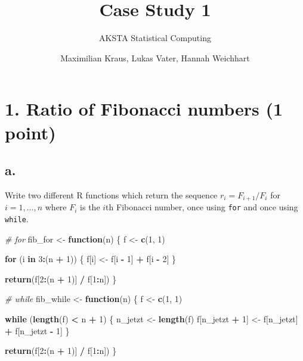 \documentclass[
]{article}
\title{Case Study 1}
\subtitle{AKSTA Statistical Computing}
\author{Maximilian Kraus, Lukas Vater, Hannah Weichhart}
\date{}
\newenvironment{Shaded}{\begin{snugshade}}{\end{snugshade}}
\newcommand{\CommentTok}[1]{\textcolor[rgb]{0.56,0.35,0.01}{\textit{#1}}}
\newcommand{\ControlFlowTok}[1]{\textcolor[rgb]{0.13,0.29,0.53}{\textbf{#1}}}
\newcommand{\DecValTok}[1]{\textcolor[rgb]{0.00,0.00,0.81}{#1}}
\newcommand{\FunctionTok}[1]{\textcolor[rgb]{0.13,0.29,0.53}{\textbf{#1}}}
\newcommand{\NormalTok}[1]{#1}
\newcommand{\OtherTok}[1]{\textcolor[rgb]{0.56,0.35,0.01}{#1}}
\newcommand{\SpecialCharTok}[1]{\textcolor[rgb]{0.81,0.36,0.00}{\textbf{#1}}}
\begin{document}
\maketitle

\section{1. Ratio of Fibonacci numbers (1
point)}\label{ratio-of-fibonacci-numbers-1-point}

\subsection{a.}\label{a.}

Write two different R functions which return the sequence
\(r_{i}=F_{i+1}/F_i\) for \(i=1,\ldots,n\) where \(F_i\) is the \(i\)th
Fibonacci number, once using \texttt{for} and once using \texttt{while}.

\begin{Shaded}
\begin{Highlighting}[]
\CommentTok{\# for }
\NormalTok{fib\_for }\OtherTok{\textless{}{-}} \ControlFlowTok{function}\NormalTok{(n) \{}
\NormalTok{  f }\OtherTok{\textless{}{-}} \FunctionTok{c}\NormalTok{(}\DecValTok{1}\NormalTok{, }\DecValTok{1}\NormalTok{)}
  
  \ControlFlowTok{for}\NormalTok{ (i }\ControlFlowTok{in} \DecValTok{3}\SpecialCharTok{:}\NormalTok{(n }\SpecialCharTok{+} \DecValTok{1}\NormalTok{)) \{}
\NormalTok{    f[i] }\OtherTok{\textless{}{-}}\NormalTok{ f[i }\SpecialCharTok{{-}} \DecValTok{1}\NormalTok{] }\SpecialCharTok{+}\NormalTok{ f[i }\SpecialCharTok{{-}} \DecValTok{2}\NormalTok{]}
\NormalTok{  \}}
  
  \FunctionTok{return}\NormalTok{(f[}\DecValTok{2}\SpecialCharTok{:}\NormalTok{(n }\SpecialCharTok{+} \DecValTok{1}\NormalTok{)] }\SpecialCharTok{/}\NormalTok{ f[}\DecValTok{1}\SpecialCharTok{:}\NormalTok{n])}
\NormalTok{\}}
  
\CommentTok{\# while}
\NormalTok{fib\_while }\OtherTok{\textless{}{-}} \ControlFlowTok{function}\NormalTok{(n) \{}
\NormalTok{  f }\OtherTok{\textless{}{-}} \FunctionTok{c}\NormalTok{(}\DecValTok{1}\NormalTok{, }\DecValTok{1}\NormalTok{)}

  \ControlFlowTok{while}\NormalTok{ (}\FunctionTok{length}\NormalTok{(f) }\SpecialCharTok{\textless{}}\NormalTok{ n }\SpecialCharTok{+} \DecValTok{1}\NormalTok{) \{}
\NormalTok{    n\_jetzt }\OtherTok{\textless{}{-}} \FunctionTok{length}\NormalTok{(f)}
\NormalTok{    f[n\_jetzt }\SpecialCharTok{+} \DecValTok{1}\NormalTok{] }\OtherTok{\textless{}{-}}\NormalTok{ f[n\_jetzt] }\SpecialCharTok{+}\NormalTok{ f[n\_jetzt }\SpecialCharTok{{-}} \DecValTok{1}\NormalTok{]}
\NormalTok{  \}}
  
  \FunctionTok{return}\NormalTok{(f[}\DecValTok{2}\SpecialCharTok{:}\NormalTok{(n }\SpecialCharTok{+} \DecValTok{1}\NormalTok{)] }\SpecialCharTok{/}\NormalTok{ f[}\DecValTok{1}\SpecialCharTok{:}\NormalTok{n])}
\NormalTok{\}}
\end{Highlighting}
\end{Shaded}
\end{document}
